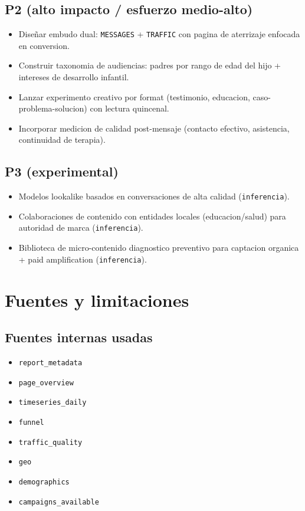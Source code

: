 \documentclass[9pt,a4paper,twocolumn,twoside]{tau-class/tau}
\begin{document}
\subsection{P2 (alto impacto / esfuerzo medio-alto)}
\begin{itemize}
  \item Diseñar embudo dual: \texttt{MESSAGES} + \texttt{TRAFFIC} con pagina de aterrizaje enfocada en conversion.
  \item Construir taxonomia de audiencias: padres por rango de edad del hijo + intereses de desarrollo infantil.
  \item Lanzar experimento creativo por format (testimonio, educacion, caso-problema-solucion) con lectura quincenal.
  \item Incorporar medicion de calidad post-mensaje (contacto efectivo, asistencia, continuidad de terapia).
\end{itemize}

\subsection{P3 (experimental)}
\begin{itemize}
  \item Modelos lookalike basados en conversaciones de alta calidad (\texttt{inferencia}).
  \item Colaboraciones de contenido con entidades locales (educacion/salud) para autoridad de marca (\texttt{inferencia}).
  \item Biblioteca de micro-contenido diagnostico preventivo para captacion organica + paid amplification (\texttt{inferencia}).
\end{itemize}

\section{Fuentes y limitaciones}

\subsection{Fuentes internas usadas}
\begin{itemize}
  \item \texttt{report\_metadata}
  \item \texttt{page\_overview}
  \item \texttt{timeseries\_daily}
  \item \texttt{funnel}
  \item \texttt{traffic\_quality}
  \item \texttt{geo}
  \item \texttt{demographics}
  \item \texttt{campaigns\_available}
\end{itemize}
\end{document}
